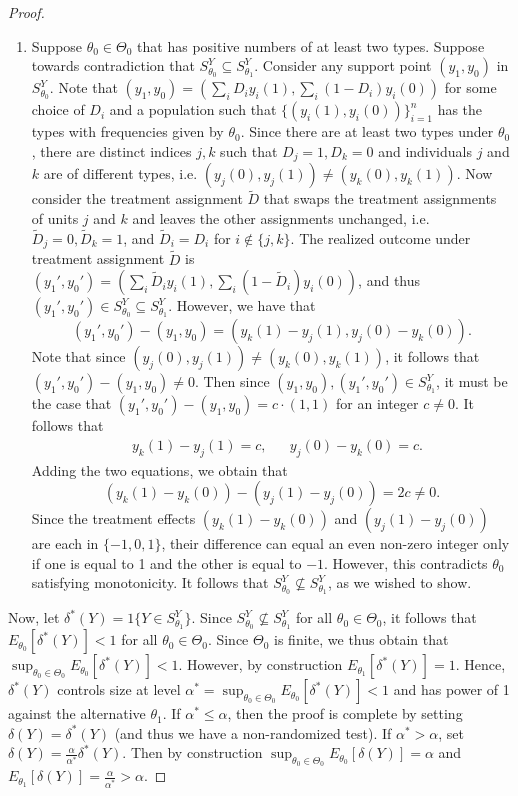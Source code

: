\documentclass[12pt,reqno]{amsart}
\theoremstyle{theorem}
\theoremstyle{definition}
\newcommand{\0}{\mathbf{0}}
\newcommand{\1}{\mathbf{1}}
\begin{document}
\begin{proof}
\begin{enumerate}
 \item [Case 2] Suppose $\theta_0 \in \Theta_0$ that has positive numbers of at least two
 types.
Suppose towards contradiction that $S^Y_{\theta_0} \subseteq S^Y_{\theta_1}$. Consider any support point $(y_1,y_0)$ in $S^Y_{\theta_0}$. Note that $(y_1,y_0) = (\sum_i D_i y_i(1), \sum_i (1-D_i) y_i(0))$ for some choice of $D_i$ and a population such that $\{(y_i(1),y_i(0)) \}_{i=1}^n$ has the types with frequencies given by $\theta_0$. Since there are at least two types under $\theta_0$, there are distinct indices $j,k$ such that $D_j =1, D_k =0$ and individuals $j$ and $k$ are of different types, i.e. $(y_j(0),y_j(1)) \neq (y_k(0),y_k(1))$. Now consider the treatment assignment $\tilde{D}$ that swaps the treatment assignments of units $j$ and $k$ and leaves the other assignments unchanged, i.e. $\tilde{D}_j =0, \tilde{D}_k = 1$, and $\tilde{D}_i = D_i$ for $i \not\in \{j,k\}$. The realized outcome under treatment assignment $\tilde{D}$ is $(y_1',y_0') = (\sum_i \tilde{D}_i y_i(1), \sum_i (1-\tilde{D}_i) y_i(0))$, and thus $(y_1',y_0') \in S^{Y}_{\theta_0} \subseteq S^{Y}_{\theta_1}$. However, we have that
$$(y_1',y_0') - (y_1,y_0) = (y_k(1) - y_j(1), y_j(0) - y_k(0) ) .$$
\noindent Note that since $(y_j(0),y_j(1)) \neq (y_k(0),y_k(1))$, it follows that $(y_1',y_0') - (y_1,y_0) \neq 0$. Then since $(y_1,y_0),(y_1',y_0') \in S^Y_{\theta_1}$, it must be the case that $(y_1',y_0') - (y_1,y_0) = c \cdot (1,1)$ for an integer $c \neq 0$. It follows that 
\begin{align*}
 & y_k(1) - y_j(1) = c,
 &
 & y_j(0) - y_k(0) = c.
\end{align*}
\noindent Adding the two equations, we obtain that 
$$(y_k(1) - y_k(0)) - (y_j(1)-y_j(0)) = 2c \neq 0 .$$
\noindent Since the treatment effects $(y_k(1) - y_k(0))$ and $(y_j(1)-y_j(0))$ are each in $\{-1,0,1\}$, their difference can equal an even non-zero integer only if one is equal to 1 and the other is equal to $-1$. However, this contradicts $\theta_0$ satisfying monotonicity. It follows that $S^Y_{\theta_0} \not\subseteq S^Y_{\theta_1}$, as we wished to show. 

\end{enumerate}

Now, let $\delta^*(Y) = 1\{ Y \in S^Y_{\theta_1} \}$. Since $S^Y_
{\theta_0} \not\subseteq S^Y_{\theta_1}$ for all $\theta_0 \in \Theta_0$, it follows that
$E_{\theta_0}[\delta^*(Y)] < 1$ for all $\theta_0 \in \Theta_0$. Since $\Theta_0$ is
finite, we thus obtain that $\sup_{\theta_0 \in \Theta_0} E_{\theta_0}[\delta^*(Y)] < 1$.
However, by construction $E_{\theta_1}[\delta^*(Y)] = 1$. Hence, $\delta^*(Y)$ controls
size at level $\alpha^* = \sup_{\theta_0 \in \Theta_0} E_{\theta_0}[\delta^*(Y)] < 1$ and
has power of 1 against the alternative $\theta_1$. If $\alpha^* \leq \alpha$, then the proof
is complete by setting $\delta(Y) = \delta^*(Y)$ (and thus we have a non-randomized
test). If $\alpha^* > \alpha$, set $\delta(Y) = \tfrac{\alpha}{\alpha^*} \delta^*
(Y)$. Then by construction $\sup_{\theta_0 \in \Theta_0} E_{\theta_0}[\delta
(Y)] = \alpha$ and $E_{\theta_1}[\delta(Y)] = \tfrac{\alpha}{\alpha^*} > \alpha$. 
\end{proof}
\end{document}
